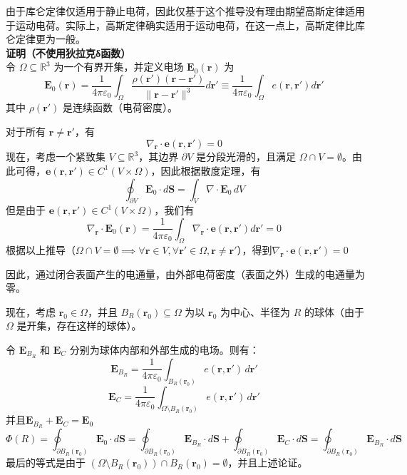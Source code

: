 由于库仑定律仅适用于静止电荷，因此仅基于这个推导没有理由期望高斯定律适用于运动电荷。实际上，高斯定律确实适用于运动电荷，在这一点上，高斯定律比库仑定律更为一般。\\
\textbf{证明（不使用狄拉克δ函数）}\\
令 \(\Omega \subseteq \mathbb{R}^3\) 为一个有界开集，并定义电场 \(\mathbf{E}_0(\mathbf{r})\) 为
\[
\mathbf{E}_0(\mathbf{r}) = \frac{1}{4\pi \varepsilon_0} \int_\Omega \frac{\rho(\mathbf{r'}) (\mathbf{r} - \mathbf{r'})}{\|\mathbf{r} - \mathbf{r'}\|^3} d\mathbf{r'} \equiv \frac{1}{4\pi \varepsilon_0} \int_\Omega e(\mathbf{r}, \mathbf{r'}) d\mathbf{r'}~
\]
其中 \(\rho(\mathbf{r'})\) 是连续函数（电荷密度）。

对于所有 \(\mathbf{r} \neq \mathbf{r'}\)，有
\[
\nabla_{\mathbf{r}} \cdot \mathbf{e}(\mathbf{r}, \mathbf{r'}) = 0~
\]
现在，考虑一个紧致集 \(V \subseteq \mathbb{R}^3\)，其边界 \(\partial V\) 是分段光滑的，且满足 \(\Omega \cap V = \emptyset\)。由此可得，\(\mathbf{e}(\mathbf{r}, \mathbf{r'}) \in C^1(V \times \Omega)\)，因此根据散度定理，有
\[
\oint_{\partial V} \mathbf{E}_0 \cdot d\mathbf{S} = \int_V \nabla \cdot \mathbf{E}_0 \, dV~
\]
但是由于 \(\mathbf{e}(\mathbf{r}, \mathbf{r'}) \in C^1(V \times \Omega)\)，我们有
\[
\nabla_{\mathbf{r}} \cdot \mathbf{E}_0(\mathbf{r}) = \frac{1}{4\pi \varepsilon_0} \int_\Omega \nabla_{\mathbf{r}} \cdot \mathbf{e}(\mathbf{r}, \mathbf{r'}) d\mathbf{r'} = 0~
\]
根据以上推导（\(\Omega \cap V = \emptyset \implies \forall \mathbf{r} \in V, \forall \mathbf{r'} \in \Omega, \mathbf{r} \neq \mathbf{r'}\)），得到\(\nabla_{\mathbf{r}} \cdot \mathbf{e}(\mathbf{r}, \mathbf{r'}) = 0\)

因此，通过闭合表面产生的电通量，由外部电荷密度（表面之外）生成的电通量为零。

现在，考虑 \(\mathbf{r}_0 \in \Omega\)，并且 \(B_R(\mathbf{r}_0) \subseteq \Omega\) 为以 \(\mathbf{r}_0\) 为中心、半径为 \(R\) 的球体（由于 \(\Omega\) 是开集，存在这样的球体）。

令 \(\mathbf{E}_{B_R}\) 和 \(\mathbf{E}_C\) 分别为球体内部和外部生成的电场。则有：
\[
\mathbf{E}_{B_R} = \frac{1}{4\pi \varepsilon_0} \int_{B_R(\mathbf{r}_0)} e(\mathbf{r}, \mathbf{r'}) \, d\mathbf{r'}~
\]
\[
\mathbf{E}_C = \frac{1}{4\pi \varepsilon_0} \int_{\Omega \setminus B_R(\mathbf{r}_0)} e(\mathbf{r}, \mathbf{r'}) \, d\mathbf{r'}~
\]并且\(\mathbf{E}_{B_R} + \mathbf{E}_C = \mathbf{E}_0\)
\[
\Phi(R) = \oint_{\partial B_R(\mathbf{r}_0)} \mathbf{E}_0 \cdot d\mathbf{S} = \oint_{\partial B_R(\mathbf{r}_0)} \mathbf{E}_{B_R} \cdot d\mathbf{S} + \oint_{\partial B_R(\mathbf{r}_0)} \mathbf{E}_C \cdot d\mathbf{S} = \oint_{\partial B_R(\mathbf{r}_0)} \mathbf{E}_{B_R} \cdot d\mathbf{S}~
\]
最后的等式是由于 \((\Omega \setminus B_R(\mathbf{r}_0)) \cap B_R(\mathbf{r}_0) = \emptyset\)，并且上述论证。

